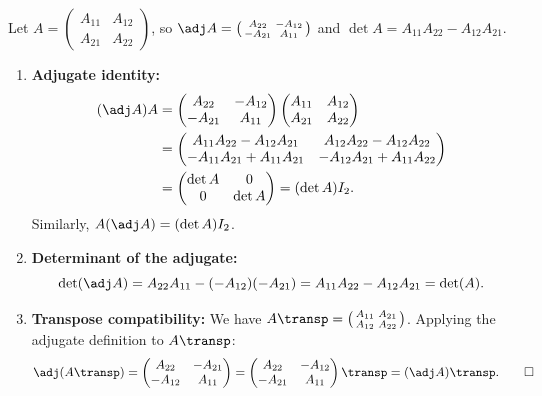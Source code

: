 \begin{exercisesolution}
\label{sol:properties_2x2_adjugate}
Let $A = \left(\begin{smallmatrix} A_{11} & A_{12} \\ A_{21} & A_{22} \end{smallmatrix}\right)$, so $\adj A = \left(\begin{smallmatrix} A_{22} & -A_{12} \\ -A_{21} & A_{11} \end{smallmatrix}\right)$ and $\det A = A_{11} A_{22} - A_{12} A_{21}$.

\begin{enumerate}[label=\textbf{(\alph*)}]
    \item \textbf{Adjugate identity:}
    \begin{align*}
    (\adj A) A &= \begin{pmatrix} A_{22} & -A_{12} \\ -A_{21} & A_{11} \end{pmatrix} \begin{pmatrix} A_{11} & A_{12} \\ A_{21} & A_{22} \end{pmatrix} \\
    &= \begin{pmatrix} A_{11}A_{22} - A_{12}A_{21} & A_{12}A_{22} - A_{12}A_{22} \\ -A_{11}A_{21} + A_{11}A_{21} & -A_{12}A_{21} + A_{11}A_{22} \end{pmatrix} \\
    &= \begin{pmatrix} \det A & 0 \\ 0 & \det A \end{pmatrix} = (\det A) I_2.
    \end{align*}
    Similarly, $A (\adj A) = (\det A) I_2$.

    \item \textbf{Determinant of the adjugate:}
    \[
    \det(\adj A) = A_{22} A_{11} - (-A_{12})(-A_{21}) = A_{11} A_{22} - A_{12} A_{21} = \det(A).
    \]

    \item \textbf{Transpose compatibility:}
    We have $A\transp = \left(\begin{smallmatrix} A_{11} & A_{21} \\ A_{12} & A_{22} \end{smallmatrix}\right)$.
    Applying the adjugate definition to $A\transp$:
    \[
    \adj(A\transp) = \begin{pmatrix} A_{22} & -A_{21} \\ -A_{12} & A_{11} \end{pmatrix} = \begin{pmatrix} A_{22} & -A_{12} \\ -A_{21} & A_{11} \end{pmatrix}\transp = (\adj A)\transp. \qedhere
    \]
\end{enumerate}
\end{exercisesolution}

